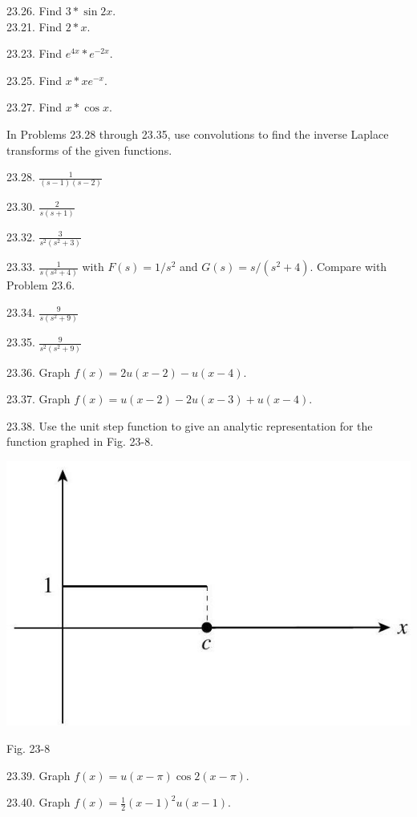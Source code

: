 \documentclass[10pt]{article}
\begin{document}
23.26. Find $3 * \sin 2 x$.\\
23.21. Find $2 * x$.

23.23. Find $e^{4 x} * e^{-2 x}$.

23.25. Find $x * x e^{-x}$.

23.27. Find $x * \cos x$.

In Problems 23.28 through 23.35, use convolutions to find the inverse Laplace transforms of the given functions.

23.28. $\frac{1}{(s-1)(s-2)}$

23.30. $\frac{2}{s(s+1)}$

23.32. $\frac{3}{s^{2}\left(s^{2}+3\right)}$

23.33. $\frac{1}{s\left(s^{2}+4\right)}$ with $F(s)=1 / s^{2}$ and $G(s)=s /\left(s^{2}+4\right)$. Compare with Problem 23.6.

23.34. $\frac{9}{s\left(s^{2}+9\right)}$

23.35. $\frac{9}{s^{2}\left(s^{2}+9\right)}$

23.36. Graph $f(x)=2 u(x-2)-u(x-4)$.

23.37. Graph $f(x)=u(x-2)-2 u(x-3)+u(x-4)$.

23.38. Use the unit step function to give an analytic representation for the function graphed in Fig. 23-8.

\begin{center}
\includegraphics[max width=\textwidth]{2024_04_03_5bb5b4275a64cb9887d1g-258}
\end{center}

Fig. 23-8

23.39. Graph $f(x)=u(x-\pi) \cos 2(x-\pi)$.

23.40. Graph $f(x)=\frac{1}{2}(x-1)^{2} u(x-1)$.
\end{document}
